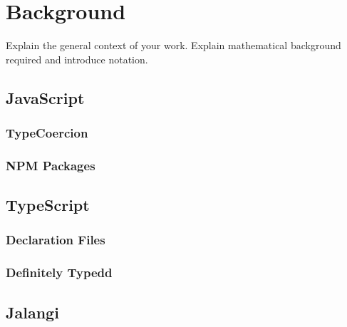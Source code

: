 \chapter{Background}\label{chap:background}
Explain the general context of your work.
Explain mathematical background required and introduce notation.



\section{JavaScript}
\subsection{TypeCoercion}
\subsection{NPM Packages}

\section{TypeScript}
\subsection{Declaration Files}
\subsection{Definitely Typedd}

\section{Jalangi}
